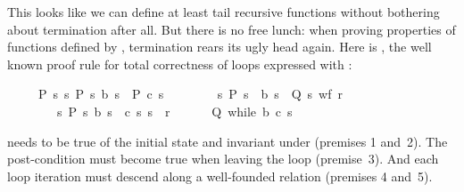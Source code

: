 \begin{isabellebody}
\begin{isamarkuptext}
This looks like we can define at least tail recursive functions
without bothering about termination after all. But there is no free
lunch: when proving properties of functions defined by ,
termination rears its ugly head again. Here is
, the well known proof rule for total
correctness of loops expressed with :
\begin{isabelle}%
\ \ \ \ \ {\isasymlbrakk}P\ s{\isacharsemicolon}\ {\isasymAnd}s{\isachardot}\ {\isasymlbrakk}P\ s{\isacharsemicolon}\ b\ s{\isasymrbrakk}\ {\isasymLongrightarrow}\ P\ {\isacharparenleft}c\ s{\isacharparenright}{\isacharsemicolon}\isanewline
\ \ \ \ \ \ \ \ {\isasymAnd}s{\isachardot}\ {\isasymlbrakk}P\ s{\isacharsemicolon}\ {\isasymnot}\ b\ s{\isasymrbrakk}\ {\isasymLongrightarrow}\ Q\ s{\isacharsemicolon}\ wf\ r{\isacharsemicolon}\isanewline
\ \ \ \ \ \ \ \ {\isasymAnd}s{\isachardot}\ {\isasymlbrakk}P\ s{\isacharsemicolon}\ b\ s{\isasymrbrakk}\ {\isasymLongrightarrow}\ {\isacharparenleft}c\ s{\isacharcomma}\ s{\isacharparenright}\ {\isasymin}\ r{\isasymrbrakk}\isanewline
\ \ \ \ \ {\isasymLongrightarrow}\ Q\ {\isacharparenleft}while\ b\ c\ s{\isacharparenright}%
\end{isabelle}  needs to be
true of the initial state  and invariant under 
(premises 1 and~2). The post-condition  must become true when
leaving the loop (premise~3). And each loop iteration must descend
along a well-founded relation  (premises 4 and~5).


\end{isamarkuptext}
\end{isabellebody}
